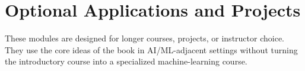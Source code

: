 \part{Optional Applications and Projects}

These modules are designed for longer courses, projects, or instructor choice.
They use the core ideas of the book in AI/ML-adjacent settings without turning
the introductory course into a specialized machine-learning course.
